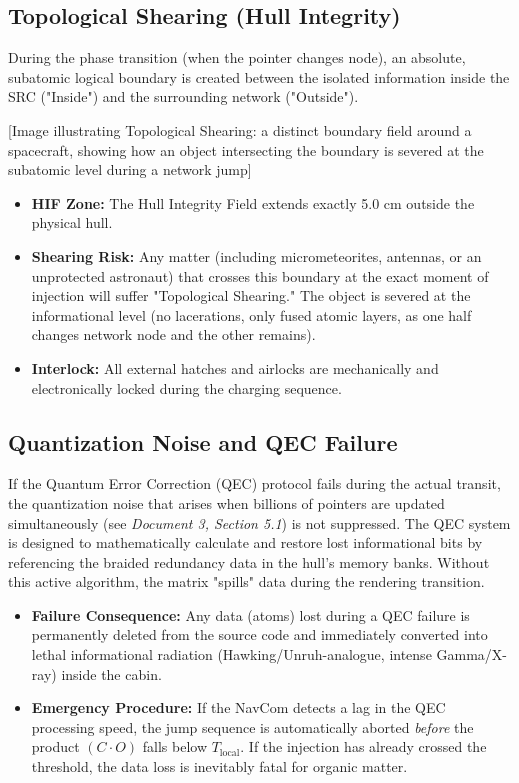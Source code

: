 \documentclass[12pt,a4paper]{article}
\begin{document}
\subsection{Topological Shearing (Hull Integrity)}
During the phase transition (when the pointer changes node), an absolute, subatomic logical boundary is created between the isolated information inside the SRC ("Inside") and the surrounding network ("Outside").

[Image illustrating Topological Shearing: a distinct boundary field around a spacecraft, showing how an object intersecting the boundary is severed at the subatomic level during a network jump]

\begin{itemize}
    \item \textbf{HIF Zone:} The Hull Integrity Field extends exactly 5.0 cm outside the physical hull.
    \item \textbf{Shearing Risk:} Any matter (including micrometeorites, antennas, or an unprotected astronaut) that crosses this boundary at the exact moment of injection will suffer "Topological Shearing." The object is severed at the informational level (no lacerations, only fused atomic layers, as one half changes network node and the other remains).
    \item \textbf{Interlock:} All external hatches and airlocks are mechanically and electronically locked during the charging sequence.
\end{itemize}

\subsection{Quantization Noise and QEC Failure}
If the Quantum Error Correction (QEC) protocol fails during the actual transit, the quantization noise that arises when billions of pointers are updated simultaneously (see \textit{Document 3, Section 5.1}) is not suppressed. The QEC system is designed to mathematically calculate and restore lost informational bits by referencing the braided redundancy data in the hull's memory banks. Without this active algorithm, the matrix "spills" data during the rendering transition.
\begin{itemize}
    \item \textbf{Failure Consequence:} Any data (atoms) lost during a QEC failure is permanently deleted from the source code and immediately converted into lethal informational radiation (Hawking/Unruh-analogue, intense Gamma/X-ray) inside the cabin.
    \item \textbf{Emergency Procedure:} If the NavCom detects a lag in the QEC processing speed, the jump sequence is automatically aborted \textit{before} the product $(C \cdot O)$ falls below $T_{\mathrm{local}}$. If the injection has already crossed the threshold, the data loss is inevitably fatal for organic matter.
\end{itemize}
\end{document}
